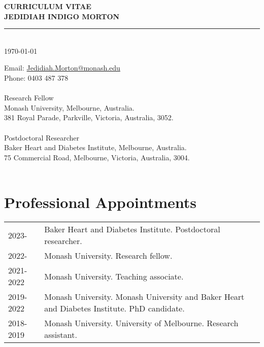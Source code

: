 \documentclass[11pt]{article}
\newcommand{\thedate}{\today}
\begin{document}
\begin{titlepage}
    \begin{center}
        \Huge
        \textbf{CURRICULUM VITAE \\
JEDIDIAH INDIGO MORTON}
\rule{16cm}{2mm} \\
\Large
\thedate \\
       \vfill
    \end{center}
        \Large

\noindent
Email: \color{blue}
 \href{mailto:Jedidiah.Morton@Monash.edu}{Jedidiah.Morton@monash.edu} \\
\color{black}
Phone: \color{blue} 0403 487 378 \\
\color{black}
 \\
Research Fellow \\
Monash University, Melbourne, Australia. \\
381 Royal Parade, Parkville, Victoria, Australia, 3052. \\
 \\
Postdoctoral Researcher \\
Baker Heart and Diabetes Institute, Melbourne, Australia. \\
75 Commercial Road, Melbourne, Victoria, Australia, 3004. \\
\\
\end{titlepage}

\tableofcontents


\color{white}
\cite{DoodyAGG2024,
MacPE2024,
MortonDRCP2024,
TanCPT2024,
LivoriIJC2024,
LivoriEJPC2023,
MacCO2024,
FelekeDRCP2023,
LordPPT2023,
AbebeEHJ2023,
MortonPECA2023,
MortonAJKD2023,
DoodyAGG2023,
MacCirc2023,
DinaPE2023,
LloydDLOGIA2023,
MortonVIH2023,
TomicDRCP2023,
LazzDLOGIA2023,
QuigleyDRCP2022,
MacVIH2022,
MortonDLOGIA2023,
TomicDRCP2022,
TomicLDE2022,
MortonEJPC2023,
AdemiPE2022,
MortonDRCP2022,
MortonDM2022b,
MortonJECH2022,
OyunTAEM2022,
RuizDLOGIA2022,
MortonDC2022,
MortonJONS2022,
HastingsPE2022,
MortonDM2022a,
HardingNDT2022,
OyunSR2021,
MortonDC2021,
MortonDLOGIA2021,
MortonDC2020}
\color{black}

\pagebreak


\section*{Professional Appointments}

\begin{tabular}{p{2cm}p{14cm}}
2023- & Baker Heart and Diabetes Institute. Postdoctoral researcher. \\
2022- & Monash University. Research fellow. \\
2021-2022 & Monash University. Teaching associate. \\
2019-2022 & Monash University. Monash University and Baker Heart and Diabetes Institute. PhD candidate. \\
2018-2019 & Monash University. University of Melbourne. Research assistant. \\
\end{tabular}
\end{document}

